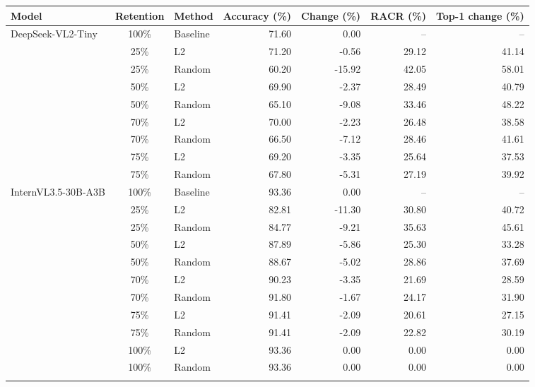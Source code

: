 \begin{tabular}{lclrrrr}
\toprule
Model & Retention & Method & Accuracy (\%) & Change (\%) & RACR (\%) & Top-1 change (\%) \\
\midrule
DeepSeek-VL2-Tiny & 100\% & Baseline & 71.60 & 0.00 & -- & -- \\
 & 25\% & L2 & 71.20 & -0.56 & 29.12 & 41.14 \\
 & 25\% & Random & 60.20 & -15.92 & 42.05 & 58.01 \\
 & 50\% & L2 & 69.90 & -2.37 & 28.49 & 40.79 \\
 & 50\% & Random & 65.10 & -9.08 & 33.46 & 48.22 \\
 & 70\% & L2 & 70.00 & -2.23 & 26.48 & 38.58 \\
 & 70\% & Random & 66.50 & -7.12 & 28.46 & 41.61 \\
 & 75\% & L2 & 69.20 & -3.35 & 25.64 & 37.53 \\
 & 75\% & Random & 67.80 & -5.31 & 27.19 & 39.92 \\
\addlinespace
InternVL3.5-30B-A3B & 100\% & Baseline & 93.36 & 0.00 & -- & -- \\
 & 25\% & L2 & 82.81 & -11.30 & 30.80 & 40.72 \\
 & 25\% & Random & 84.77 & -9.21 & 35.63 & 45.61 \\
 & 50\% & L2 & 87.89 & -5.86 & 25.30 & 33.28 \\
 & 50\% & Random & 88.67 & -5.02 & 28.86 & 37.69 \\
 & 70\% & L2 & 90.23 & -3.35 & 21.69 & 28.59 \\
 & 70\% & Random & 91.80 & -1.67 & 24.17 & 31.90 \\
 & 75\% & L2 & 91.41 & -2.09 & 20.61 & 27.15 \\
 & 75\% & Random & 91.41 & -2.09 & 22.82 & 30.19 \\
 & 100\% & L2 & 93.36 & 0.00 & 0.00 & 0.00 \\
 & 100\% & Random & 93.36 & 0.00 & 0.00 & 0.00 \\
\addlinespace
\bottomrule
\end{tabular}
